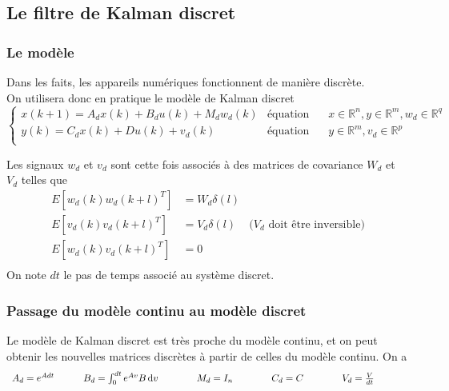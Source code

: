 \documentclass[12pt,twoside,a4paper]{article}
\begin{document}
\subsection{Le filtre de Kalman discret}

\subsubsection{Le modèle}
Dans les faits, les appareils numériques fonctionnent de manière discrète. \\
On utilisera donc en pratique le modèle de Kalman discret
$$
\left\{ 
\begin{array}{lll}
        x(k+1) = A_d x(k) + B_d u(k) +M_d w_d(k) & \text{équation d'état} & x \in \mathbb{R}^n, y \in \mathbb{R}^m, w_d \in \mathbb{R}^q\\
       y(k) = C_d x(k) + Du(k) + v_d(k) & \text{équation de mesure} & y \in \mathbb{R}^m, v_d \in \mathbb{R}^p\\
\end{array}
\right.
$$

Les signaux $w_d$ et $v_d$ sont cette fois associés à des matrices de covariance $W_d$ et $V_d$ telles que
$$
\begin{array}{lll}
E[w_d(k) w_d(k+l)^T ] &= W_d \delta(l) &  \\
E[v_d(k) v_d(k+l)^T ] &= V_d \delta(l) & \text{($V_d$ doit être inversible)}\\
E[w_d(k) v_d(k+l)^T ] &= 0 & \\
\end{array}
$$
On note $dt$ le pas de temps associé au système discret.\\

\subsubsection{Passage du modèle continu au modèle discret}

\vspace{0.3cm}
Le modèle de Kalman discret est très proche du modèle continu, et on peut obtenir les nouvelles matrices discrètes à partir de celles du modèle continu. On a
$$ \begin{array}{ccccc}
A_d = e^{Adt} \rule[0pt]{30pt}{0pt}
B_d = \int_0^{dt} e^{Av}B \, \mathrm{d}v \rule[0pt]{30pt}{0pt}& 
M_d = I_n \rule[0pt]{30pt}{0pt}&
C_d = C\rule[0pt]{30pt}{0pt} & 
V_d= \frac{V}{dt}\rule[0pt]{30pt}{0pt}\\
\end{array} $$
\end{document}
